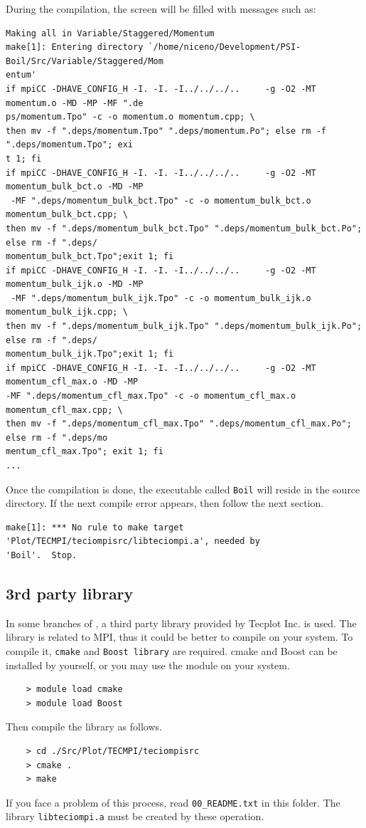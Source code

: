 During the compilation, the screen will be filled with messages such as:
%
{\small \begin{verbatim}
Making all in Variable/Staggered/Momentum
make[1]: Entering directory `/home/niceno/Development/PSI-Boil/Src/Variable/Staggered/Mom
entum'
if mpiCC -DHAVE_CONFIG_H -I. -I. -I../../../..     -g -O2 -MT momentum.o -MD -MP -MF ".de
ps/momentum.Tpo" -c -o momentum.o momentum.cpp; \
then mv -f ".deps/momentum.Tpo" ".deps/momentum.Po"; else rm -f ".deps/momentum.Tpo"; exi
t 1; fi
if mpiCC -DHAVE_CONFIG_H -I. -I. -I../../../..     -g -O2 -MT momentum_bulk_bct.o -MD -MP
 -MF ".deps/momentum_bulk_bct.Tpo" -c -o momentum_bulk_bct.o momentum_bulk_bct.cpp; \
then mv -f ".deps/momentum_bulk_bct.Tpo" ".deps/momentum_bulk_bct.Po"; else rm -f ".deps/
momentum_bulk_bct.Tpo";exit 1; fi
if mpiCC -DHAVE_CONFIG_H -I. -I. -I../../../..     -g -O2 -MT momentum_bulk_ijk.o -MD -MP
 -MF ".deps/momentum_bulk_ijk.Tpo" -c -o momentum_bulk_ijk.o momentum_bulk_ijk.cpp; \
then mv -f ".deps/momentum_bulk_ijk.Tpo" ".deps/momentum_bulk_ijk.Po"; else rm -f ".deps/
momentum_bulk_ijk.Tpo";exit 1; fi
if mpiCC -DHAVE_CONFIG_H -I. -I. -I../../../..     -g -O2 -MT momentum_cfl_max.o -MD -MP 
-MF ".deps/momentum_cfl_max.Tpo" -c -o momentum_cfl_max.o momentum_cfl_max.cpp; \
then mv -f ".deps/momentum_cfl_max.Tpo" ".deps/momentum_cfl_max.Po"; else rm -f ".deps/mo
mentum_cfl_max.Tpo"; exit 1; fi
...
\end{verbatim}}
%
Once the compilation is done, the executable called {\tt Boil} will reside in the
source directory. If the next compile error appears, then follow the next section.
{\small \begin{verbatim}
make[1]: *** No rule to make target 'Plot/TECMPI/teciompisrc/libteciompi.a', needed by 
'Boil'.  Stop.
\end{verbatim}}

\subsection{3rd party library}

In some branches of {\psiboil}, a third party library provided by Tecplot Inc. is used. 
The library is related to MPI, thus it could be better to compile on your system. To 
compile it, {\tt cmake} and {\tt Boost library} are required. cmake and Boost can be 
installed by yourself, or you may use the module on your system.
\begin{verbatim}
	> module load cmake
	> module load Boost
\end{verbatim}
Then compile the library as follows.
\begin{verbatim}
	> cd ./Src/Plot/TECMPI/teciompisrc
	> cmake .
	> make
\end{verbatim}
If you face a problem of this process, read {\tt 00\_README.txt} in this folder. The library
 {\tt libteciompi.a} must be created by these operation.

